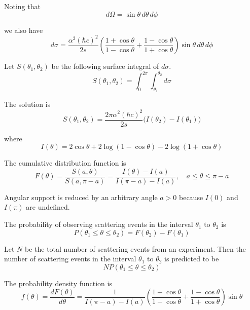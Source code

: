 Noting that
\begin{equation*}
d\Omega=\sin\theta\,d\theta\,d\phi
\end{equation*}

we also have
\begin{equation*}
d\sigma=
\frac{\alpha^2(\hbar c)^2}{2s}
\left(
\frac{1+\cos\theta}{1-\cos\theta}+
\frac{1-\cos\theta}{1+\cos\theta}
\right)\sin\theta\,d\theta\,d\phi
\end{equation*}

Let $S(\theta_1,\theta_2)$ be the following surface integral of $d\sigma$.
\begin{equation*}
S(\theta_1,\theta_2)=\int_0^{2\pi}\int_{\theta_1}^{\theta_2}d\sigma
\end{equation*}

The solution is
\begin{equation*}
S(\theta_1,\theta_2)=\frac{2\pi\alpha^2(\hbar c)^2}{2s}
\bigl(I(\theta_2)-I(\theta_1)\bigr)
\end{equation*}

where
\begin{equation*}
I(\theta)=2\cos\theta+2\log(1-\cos\theta)-2\log(1+\cos\theta)
\end{equation*}

The cumulative distribution function is
\begin{equation*}
F(\theta)
=\frac{S(a,\theta)}{S(a,\pi-a)}
=\frac{I(\theta)-I(a)}{I(\pi-a)-I(a)},
\quad
a\le\theta\le\pi-a
\end{equation*}

Angular support is reduced by an arbitrary angle $a>0$ because $I(0)$ and $I(\pi)$ are undefined.

\bigskip
The probability of observing scattering events in the interval $\theta_1$ to $\theta_2$ is
\begin{equation*}
P(\theta_1\le\theta\le\theta_2)=F(\theta_2)-F(\theta_1)
\end{equation*}

Let $N$ be the total number of scattering events from an experiment.
Then the number of scattering events in the interval $\theta_1$
to $\theta_2$ is predicted to be
\begin{equation*}
NP(\theta_1\le\theta\le\theta_2)
\end{equation*}

The probability density function is
\begin{equation*}
f(\theta)=\frac{dF(\theta)}{d\theta}
=\frac{1}{I(\pi-a)-I(a)}
\left(\frac{1+\cos\theta}{1-\cos\theta}+\frac{1-\cos\theta}{1+\cos\theta}\right)
\sin\theta
\end{equation*}

